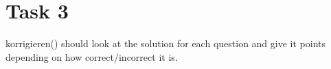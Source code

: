 \chapter{Task 3}
\begin{parlist}
  \item korrigieren() should look at the solution for each question and give it points depending on how correct/incorrect it is.
\end{parlist}
